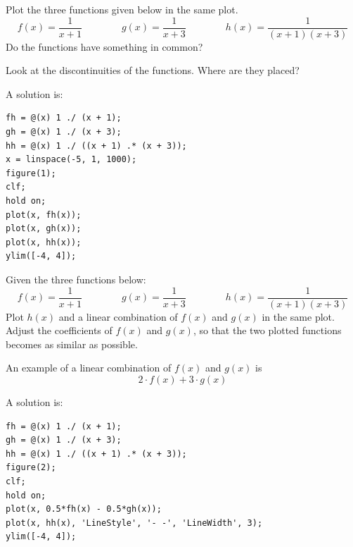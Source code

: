 \begin{ex}
Plot the three functions given below in the same plot.
\[
f(x) = \frac{1}{x + 1} \qquad \qquad g(x) = \frac{1}{x + 3} \qquad \qquad h(x) = \frac{1}{(x + 1)(x + 3)}
\]
Do the functions have something in common?
\begin{hint}
Look at the discontinuities of the functions. Where are they placed?
\end{hint}
\begin{sol}
A solution is:
\begin{verbatim}
fh = @(x) 1 ./ (x + 1);
gh = @(x) 1 ./ (x + 3);
hh = @(x) 1 ./ ((x + 1) .* (x + 3));
x = linspace(-5, 1, 1000);
figure(1);
clf; 
hold on;
plot(x, fh(x));
plot(x, gh(x));
plot(x, hh(x));
ylim([-4, 4]);
\end{verbatim}
\end{sol}
\end{ex}

\begin{ex}
Given the three functions below:
\[
f(x) = \frac{1}{x + 1} \qquad \qquad g(x) = \frac{1}{x + 3} \qquad \qquad h(x) = \frac{1}{(x + 1)(x + 3)}
\]
Plot $h(x)$ and a linear combination of $f(x)$ and $g(x)$ in the same plot.
Adjust the coefficients of $f(x)$ and $g(x)$, so that the two plotted functions 
becomes as similar as possible.
\begin{hint}
An example of a linear combination of $f(x)$ and $g(x)$ is
\[
2 \cdot f(x) + 3 \cdot g(x)
\]
\end{hint}
\begin{sol}
A solution is:
\begin{verbatim}
fh = @(x) 1 ./ (x + 1);
gh = @(x) 1 ./ (x + 3);
hh = @(x) 1 ./ ((x + 1) .* (x + 3));
figure(2);
clf; 
hold on;
plot(x, 0.5*fh(x) - 0.5*gh(x));
plot(x, hh(x), 'LineStyle', '- -', 'LineWidth', 3);
ylim([-4, 4]);
\end{verbatim}
\end{sol}
\end{ex}




